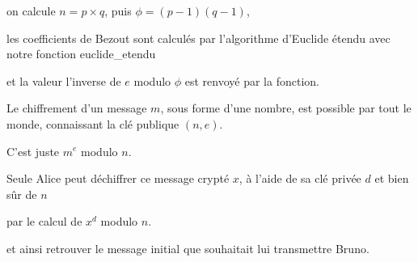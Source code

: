 on calcule $n=p\times q$, puis $\phi=(p-1)(q-1)$, 

les coefficients de Bezout sont calculés par l'algorithme d'Euclide étendu avec notre fonction euclide\_etendu

et la valeur l'inverse de $e$ modulo $\phi$ est renvoyé par la fonction.

\change

Le chiffrement d'un message $m$, sous forme d'une nombre, est possible par tout le monde, 
connaissant la clé publique $(n,e)$.

C'est juste $m^e$ modulo $n$.


\change

Seule Alice peut déchiffrer ce message crypté $x$, à l'aide de sa clé privée $d$ et bien sûr de $n$

par le calcul de $x^d$ modulo $n$.

et ainsi retrouver le message initial que souhaitait lui transmettre Bruno.


